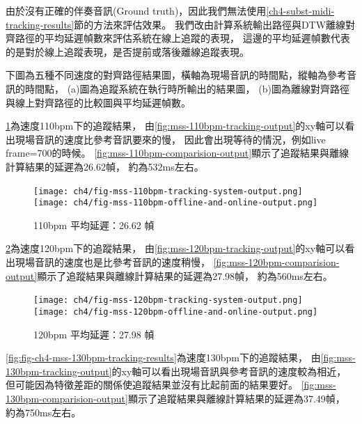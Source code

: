 \documentclass[class=NCU_thesis, crop=false]{standalone}
\begin{document}
由於沒有正確的伴奏音訊(Ground truth)，因此我們無法使用\ref{ch4-subst-midi-tracking-results}節的方法來評估效果。
我們改由計算系統輸出路徑與DTW離線對齊路徑的平均延遲幀數來評估系統在線上追蹤的表現，
這邊的平均延遲幀數代表的是對於線上追蹤表現，是否提前或落後離線追蹤表現。

下圖為五種不同速度的對齊路徑結果圖，橫軸為現場音訊的時間點，縱軸為參考音訊的時間點，
(a)圖為追蹤系統在執行時所輸出的結果圖，
(b)圖為離線對齊路徑與線上對齊路徑的比較圖與平均延遲幀數。

\cref{fig:fig-ch4-mss-110bpm-tracking-results}為速度110bpm下的追蹤結果，
由\cref{fig:mss-110bpm-tracking-output}的xy軸可以看出現場音訊的速度比參考音訊要來的慢，
因此會出現等待的情況，例如live frame=700的時候。
\cref{fig:mss-110bpm-comparision-output}顯示了追蹤結果與離線計算結果的延遲為26.62幀，
約為532ms左右。

\begin{figure}[H]
    \centering
    \subcaptionbox
    {
    \label{fig:mss-110bpm-tracking-output}}
    {\texttt{[image: ch4/fig-mss-110bpm-tracking-system-output.png]}}
    ~
    \subcaptionbox
    {
    \label{fig:mss-110bpm-comparision-output}}
    {\texttt{[image: ch4/fig-mss-110bpm-offline-and-online-output.png]}}
    \caption{110bpm 平均延遲：26.62 幀}
    \label{fig:fig-ch4-mss-110bpm-tracking-results}
\end{figure}

\cref{fig:fig-ch4-mss-120bpm-tracking-results}為速度120bpm下的追蹤結果，
由\cref{fig:mss-120bpm-tracking-output}的xy軸可以看出現場音訊的速度也是比參考音訊的速度稍慢，
\cref{fig:mss-120bpm-comparision-output}顯示了追蹤結果與離線計算結果的延遲為27.98幀，
約為560ms左右。

\begin{figure}[H]
    \centering
    \subcaptionbox
    {
    \label{fig:mss-120bpm-tracking-output}}
    {\texttt{[image: ch4/fig-mss-120bpm-tracking-system-output.png]}}
    ~
    \subcaptionbox
    {
    \label{fig:mss-120bpm-comparision-output}}
    {\texttt{[image: ch4/fig-mss-120bpm-offline-and-online-output.png]}}
    \caption{120bpm 平均延遲：27.98 幀}
    \label{fig:fig-ch4-mss-120bpm-tracking-results}
\end{figure}

\cref{fig:fig-ch4-mss-130bpm-tracking-results}為速度130bpm下的追蹤結果，
由\cref{fig:mss-130bpm-tracking-output}的xy軸可以看出現場音訊與參考音訊的速度較為相近，
但可能因為特徵差距的關係使追蹤結果並沒有比起前面的結果要好。
\cref{fig:mss-130bpm-comparision-output}顯示了追蹤結果與離線計算結果的延遲為37.49幀，
約為750ms左右。
\end{document}
